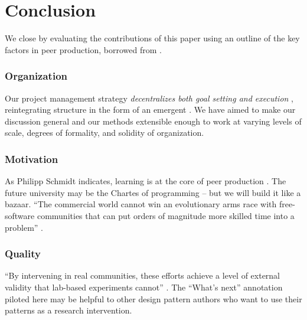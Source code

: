 \section{Conclusion}\label{sec:Conclusion}


We close by evaluating the contributions of this paper using an
outline of the key factors in peer production, borrowed from
\cite{benkler2015peer}.

\vspace{-.25\baselineskip}

\subsubsection*{Organization} 
Our project management strategy \emph{decentralizes both goal setting
  and execution} \cite{benkler2015peer}, reintegrating structure in
the form of an emergent .  We have aimed to make
our discussion general and our methods extensible enough to work at
varying levels of scale, degrees of formality, and solidity of
organization.

\vspace{-.25\baselineskip}

\subsubsection*{Motivation}  As Philipp Schmidt indicates, learning
is at the core of peer production \cite{schmidt+commons-based+2009}.  The future university may be the
Chartes of programming -- but we will build it like a bazaar. ``The
commercial world cannot win an evolutionary arms race with
free-software communities that can put orders of magnitude more
skilled time into a problem'' \cite{raymond2001cathedral}.

\vspace{-.25\baselineskip}

\subsubsection*{Quality} 
``By intervening in real communities, these efforts achieve a level of
external validity that lab-based experiments cannot'' \cite{benkler2015peer}.
The ``What's next'' annotation piloted here may be helpful to other
design pattern authors who want to use their patterns as a research intervention.



